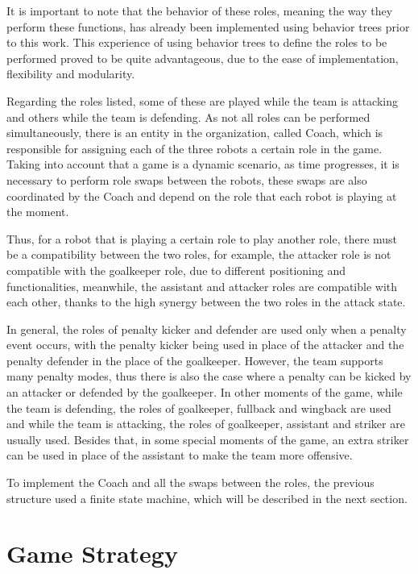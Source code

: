 It is important to note that the behavior of these roles, meaning the way they perform these functions, has already been implemented using behavior trees prior to this work. This experience of using behavior trees to define the roles to be performed proved to be quite advantageous, due to the ease of implementation, flexibility and modularity.

Regarding the roles listed, some of these are played while the team is attacking and others while the team is defending. As not all roles can be performed simultaneously, there is an entity in the organization, called Coach, which is responsible for assigning each of the three robots a certain role in the game. Taking into account that a game is a dynamic scenario, as time progresses, it is necessary to perform role swaps between the robots, these swaps are also coordinated by the Coach and depend on the role that each robot is playing at the moment.

Thus, for a robot that is playing a certain role to play another role, there must be a compatibility between the two roles, for example, the attacker role is not compatible with the goalkeeper role, due to different positioning and functionalities, meanwhile, the assistant and attacker roles are compatible with each other, thanks to the high synergy between the two roles in the attack state.

In general, the roles of penalty kicker and defender are used only when a penalty event occurs, with the penalty kicker being used in place of the attacker and the penalty defender in the place of the goalkeeper. However, the team supports many penalty modes, thus there is also the case where a penalty can be kicked by an attacker or defended by the goalkeeper. In other moments of the game, while the team is defending, the roles of goalkeeper, fullback and wingback are used and while the team is attacking, the roles of goalkeeper, assistant and striker are usually used. Besides that, in some special moments of the game, an extra striker can be used in place of the assistant to make the team more offensive.

To implement the Coach and all the swaps between the roles, the previous structure used a finite state machine, which will be described in the next section.

\section{Game Strategy}

